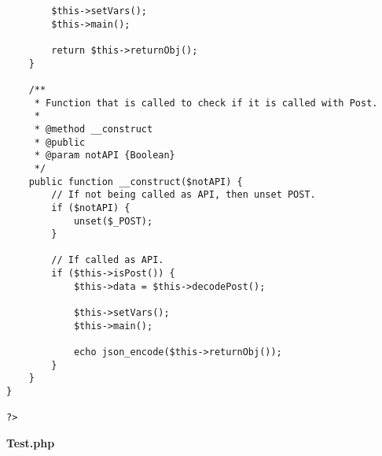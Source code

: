 {\begin{lstlisting}
		$this->setVars();
		$this->main();

		return $this->returnObj();
	}

	/**
	 * Function that is called to check if it is called with Post.
	 *
	 * @method __construct
	 * @public
	 * @param notAPI {Boolean}
	 */
	public function __construct($notAPI) {
		// If not being called as API, then unset POST.
		if ($notAPI) {
			unset($_POST);
		}

		// If called as API.
		if ($this->isPost()) {
			$this->data = $this->decodePost();

			$this->setVars();
			$this->main();

			echo json_encode($this->returnObj());
		}
	}
}

?>\end{lstlisting}
}
\textbf{Test.php}

